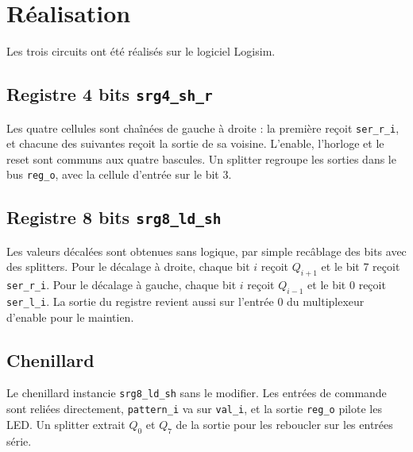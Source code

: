 \section{Réalisation}

Les trois circuits ont été réalisés sur le logiciel Logisim.

\subsection{Registre 4 bits \texttt{srg4\_sh\_r}}

Les quatre cellules sont chaînées de gauche à droite : la première reçoit \texttt{ser\_r\_i}, et chacune des suivantes reçoit la sortie de sa voisine. L'enable, l'horloge et le reset sont communs aux quatre bascules. Un splitter regroupe les sorties dans le bus \texttt{reg\_o}, avec la cellule d'entrée sur le bit 3.


\subsection{Registre 8 bits \texttt{srg8\_ld\_sh}}

Les valeurs décalées sont obtenues sans logique, par simple recâblage des bits avec des splitters. Pour le décalage à droite, chaque bit $i$ reçoit $Q_{i+1}$ et le bit 7 reçoit \texttt{ser\_r\_i}. Pour le décalage à gauche, chaque bit $i$ reçoit $Q_{i-1}$ et le bit 0 reçoit \texttt{ser\_l\_i}. La sortie du registre revient aussi sur l'entrée 0 du multiplexeur d'enable pour le maintien.


\subsection{Chenillard}

Le chenillard instancie \texttt{srg8\_ld\_sh} sans le modifier. Les entrées de commande sont reliées directement, \texttt{pattern\_i} va sur \texttt{val\_i}, et la sortie \texttt{reg\_o} pilote les LED. Un splitter extrait $Q_0$ et $Q_7$ de la sortie pour les reboucler sur les entrées série.

